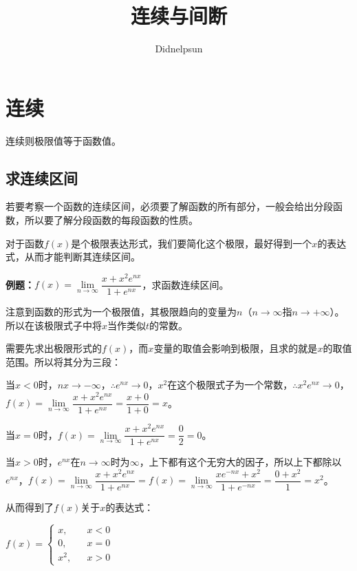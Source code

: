 \documentclass[UTF8, 12pt]{ctexart}
\author{Didnelpsun}
\title{连续与间断}
\date{}
\begin{document}
\maketitle
\pagestyle{empty}
\thispagestyle{empty}
\tableofcontents
\thispagestyle{empty}
\newpage
\pagestyle{plain}
\setcounter{page}{1}
\section{连续}

连续则极限值等于函数值。

\subsection{求连续区间}

若要考察一个函数的连续区间，必须要了解函数的所有部分，一般会给出分段函数，所以要了解分段函数的每段函数的性质。

对于函数$f(x)$是个极限表达形式，我们要简化这个极限，最好得到一个$x$的表达式，从而才能判断其连续区间。\medskip

\textbf{例题：}$f(x)=\lim\limits_{n\to\infty}\dfrac{x+x^2e^{nx}}{1+e^{nx}}$，求函数连续区间。\medskip

注意到函数的形式为一个极限值，其极限趋向的变量为$n$（$n\to\infty$指$n\to+\infty$）。所以在该极限式子中将$x$当作类似$t$的常数。

需要先求出极限形式的$f(x)$，而$x$变量的取值会影响到极限，且求的就是$x$的取值范围。所以将其分为三段：

当$x<0$时，$nx\to-\infty$，$\therefore e^{nx}\to 0$，$x^2$在这个极限式子为一个常数，$\therefore x^2e^{nx}\to 0$，$f(x)=\lim\limits_{n\to\infty}\dfrac{x+x^2e^{nx}}{1+e^{nx}}=\dfrac{x+0}{1+0}=x$。\medskip

当$x=0$时，$f(x)=\lim\limits_{n\to\infty}\dfrac{x+x^2e^{nx}}{1+e^{nx}}=\dfrac{0}{2}=0$。\medskip

当$x>0$时，$e^{nx}$在$n\to\infty$时为$\infty$，上下都有这个无穷大的因子，所以上下都除以$e^{nx}$，$f(x)=\lim\limits_{n\to\infty}\dfrac{x+x^2e^{nx}}{1+e^{nx}}=f(x)=\lim\limits_{n\to\infty}\dfrac{xe^{-nx}+x^2}{1+e^{-nx}}=\dfrac{0+x^2}{1}=x^2$。\medskip

从而得到了$f(x)$关于$x$的表达式：\medskip

$f(x)=\left\{\begin{array}{lcl}
        x,   &  & x<0 \\
        0,   &  & x=0 \\
        x^2, &  & x>0
    \end{array}
    \right.$\medskip
\end{document}

